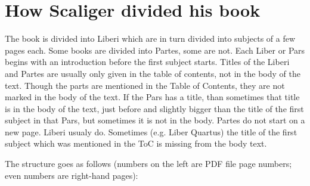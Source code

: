 \documentclass{report}
\begin{document}
\chapter{How Scaliger divided his book}
The book is divided into Liberi which are in turn divided into subjects of a few pages each. Some books are divided into Partes, some are not. Each Liber or Pars begins with an introduction before the first subject starts. Titles of the Liberi and Partes are usually only given in the table of contents, not in the body of the text. Though the parts are mentioned in the Table of Contents, they are not marked in the body of the text. If the Pars has a title, than sometimes that title is in the body of the text, just before and slightly bigger than the title of the first subject in that Pars, but sometimes it is not in the body. Partes do not start on a new page. Liberi usualy do. Sometimes (e.g. Liber Quartus) the title of the first subject which was mentioned in the ToC is missing from the body text.

The structure goes as follows (numbers on the left are PDF file page numbers; even numbers are right-hand pages):
\end{document}
